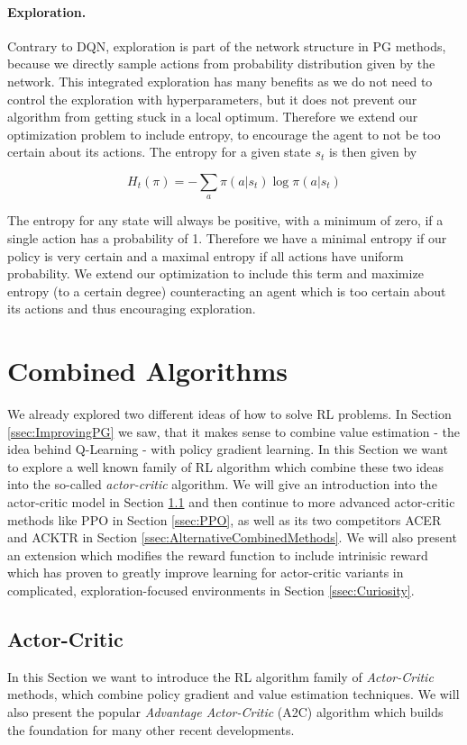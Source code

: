 \paragraph{Exploration.}
Contrary to DQN, exploration is part of the network structure in PG methods, because we directly sample actions from probability distribution given by the network. This integrated exploration has many benefits as we do not need to control the exploration with hyperparameters, but it does not prevent our algorithm from getting stuck in a local optimum. Therefore we extend our optimization problem to include entropy, to encourage the agent to not be too certain about its actions. The entropy for a given state $s_t$ is then given by

\[H_t(\pi) = -\sum_{a}\pi(a|s_t) \log \pi(a|s_t)\]

The entropy for any state will always be positive, with a minimum of zero, if a single action has a probability of 1. Therefore we have a minimal entropy if our policy is very certain and a maximal entropy if all actions have uniform probability. We extend our optimization to include this term and maximize entropy (to a certain degree) counteracting an agent which is too certain about its actions and thus encouraging exploration.

\section{Combined Algorithms} \label{sec:CombinedMethods}
We already explored two different ideas of how to solve RL problems. In Section \ref{ssec:ImprovingPG} we saw, that it makes sense to combine value estimation - the idea behind Q-Learning - with policy gradient learning. In this Section we want to explore a well known family of RL algorithm which combine these two ideas into the so-called \textit{actor-critic} algorithm. We will give an introduction into the actor-critic model in Section \ref{ssec:A2C} and then continue to more advanced actor-critic methods like PPO in Section \ref{ssec:PPO}, as well as its two competitors ACER and ACKTR in Section \ref{ssec:AlternativeCombinedMethods}. We will also present an extension which modifies the reward function to include intrinisic reward which has proven to greatly improve learning for actor-critic variants in complicated, exploration-focused environments in Section \ref{ssec:Curiosity}. 

\subsection{Actor-Critic} \label{ssec:A2C}
In this Section we want to introduce the RL algorithm family of \textit{Actor-Critic} methods, which combine policy gradient and value estimation techniques. We will also present the popular \textit{Advantage Actor-Critic} (A2C) algorithm which builds the foundation for many other recent developments. 

